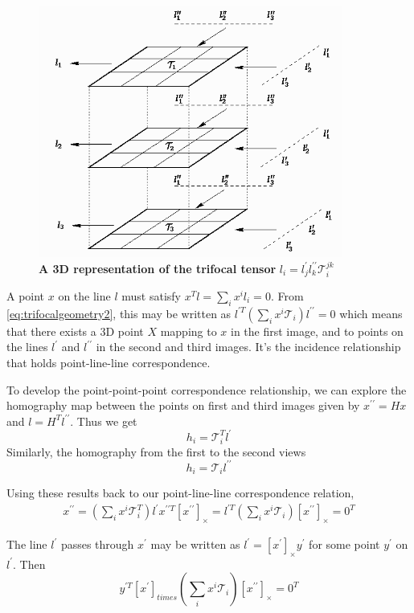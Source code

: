 \begin{figure}[ht!]
  \centering
  \includegraphics[width=100mm]{figures/trifocaltensor.png}
  \caption{\textbf{A 3D representation of the trifocal tensor}  $l_{i} = l_{j}^{\prime} l_{k}^{\prime \prime} \mathcal{T}_{i}^{jk}$ }
  \label{fig:trifocaltensor}
\end{figure}

A point $x$ on the line $l$ must satisfy $x^{T}l = \sum_{i} x^{i}l_{i} = 0$. From \eqref{eq:trifocalgeometry2}, this may be written as
$
l^{\prime T}(\sum_{i} x^{i}\mathcal{T}_{i}) l^{\prime \prime} = 0
$
which means that there exists a 3D point $X$ mapping to $x$ in the first image, and to points on the lines $l^{\prime}$ and $l^{\prime \prime}$ in the second and third images. It's the incidence relationship that holds point-line-line correspondence.

To develop the point-point-point correspondence relationship, we can explore the homography map between the points on first and third images given by $x^{\prime \prime} = Hx$ and $l = H^{T}l^{\prime \prime}$. Thus we get
$$
  h_i = \mathcal{T}^{T}_{i}l^{\prime}
$$
Similarly, the homography from the first to the second views
$$
  h_i = \mathcal{T}_{i}l^{\prime \prime}
$$

Using these results back to our point-line-line correspondence relation,
\begin{gather*}
  x^{\prime \prime} = (\sum_{i} x^{i}\mathcal{T}^{T}_{i}) l^{\prime}
  x^{\prime \prime T}[x^{\prime \prime}]_{\times} = l^{\prime T} (\sum_{i} x^{i}\mathcal{T}_{i})[x^{\prime \prime}]_{\times} = 0^{T}
\end{gather*}

The line $l^{\prime}$ passes through $x^{\prime}$ may be written as $l^{\prime} = [x^{\prime}]_{\times}y^{\prime}$ for some point $y^{\prime}$ on $l^{\prime}$. Then
$$
  y^{\prime T} [x^{\prime}]_{times} (\sum_{i} x^{i}\mathcal{T}_{i})[x^{\prime \prime}]_{\times} = 0^{T}
$$

